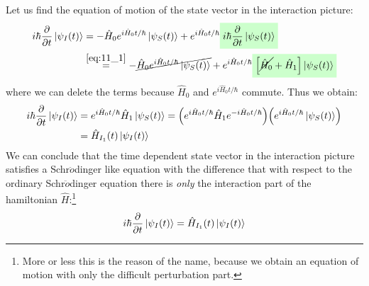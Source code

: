 \documentclass[../main/main.tex]{subfiles}
\begin{document}
Let us find the equation of motion of the state vector in the interaction picture: 
\begin{equation*}
\begin{split}
  i \hbar \pdv{}{t} \ket{\psi _I (t)} &= - \hat{H}_0 e^{i \hat{H}_0 t/ \hbar  } \ket{\psi _S (t)} +  e^{i \hat{H}_0 t/ \hbar  } \mathcolorbox{green!20}{i \hbar \pdv{}{t} \ket{\psi _S (t)}}    \\
  &\overset{\eqref{eq:11_1}}{=}  - \cancel{\hat{H}_0  e^{i \hat{H}_0 t/ \hbar  } \ket{\psi _S (t)} }
  + e^{i \hat{H}_0 t/ \hbar  } \mathcolorbox{green!20}{\qty[ \cancel{\hat{H}_0} + \hat{H}_1  ] \ket{\psi _S (t)}}
\end{split}
\end{equation*}
where we can delete the terms because \( \hat{H}_0  \) and \( e^{i \hat{H}_0 t/\hbar  }  \) commute.
Thus we obtain:
\begin{equation*}
\begin{split}
  i \hbar \pdv{}{t} \ket{\psi _I (t)} &= e^{i \hat{H}_0 t/ \hbar  } \hat{H}_1 \ket{\psi _S (t)}  = \qty(e^{i \hat{H}_0 t/ \hbar  } \hat{H}_1 e^{-i \hat{H}_0 t/ \hbar  }) \qty(e^{i \hat{H}_0 t/ \hbar  } \ket{\psi _S (t)} )  \\
  &= \hat{H}_{I_1} (t)  \ket{\psi _I (t)}
\end{split}
\end{equation*}
We can conclude that the time dependent state vector in the interaction picture satisfies a Schr$\ddot{o}$dinger like equation with the difference that with respect to the ordinary Schr$\ddot{o}$dinger equation there is \emph{only} the interaction part of the hamiltonian \( \hat{H}  \):\footnote{More or less this is the reason of the name, because we obtain an equation of motion with only the difficult perturbation part.}
\begin{equation}
  i \hbar \pdv{}{t} \ket{\psi _I (t)} = \hat{H}_{I_1} (t)  \ket{\psi _I (t)}
\end{equation}
\end{document}
